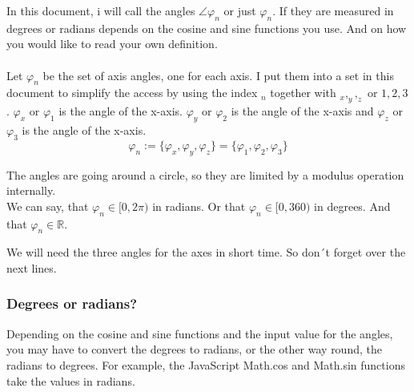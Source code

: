 \documentclass[a4paper]{article}
\begin{document}
In this document, i will call the angles $\angle \varphi_{n}$ or just $\varphi_{n}$. If they are measured in degrees or radians depends on the cosine and sine functions you use. And on how you would like to read your own definition.\\

\\


Let $\varphi_{n}$ be the set of axis angles, one for each axis. I put them into a set in this document to simplify the access by
using the index $_{n}$ together with $_x, _y, _z$ or $1,2,3$. $\varphi_x$ or $\varphi_1$ is the angle of the x-axis. $\varphi_y$ or $\varphi_2$ is the angle of the x-axis and $\varphi_z$ or $\varphi_3$ is the angle of the x-axis. \\

\begin{displaymath}
\varphi_{n} := \{\varphi_x, \varphi_y, \varphi_z\} = \{ \varphi_1, \varphi_2, \varphi_3 \}
\end{displaymath}

The angles are going around a circle, so they are limited by a modulus operation internally.\\

We can say, that $\varphi_n \in [0,2\pi)$ in radians. Or that $\varphi_n \in [0,360)$ in degrees. And that $\varphi_n \in \mathbb{R}$.

We will need the three angles for the axes in short time. So don´t forget over the next lines.\\

\subsubsection{Degrees or radians?}

Depending on the cosine and sine functions and the input value for the angles, you may have to convert the degrees to radians, or
the other way round, the radians to degrees. For example, the JavaScript Math.cos and Math.sin functions take the values in radians.\\
\end{document}
